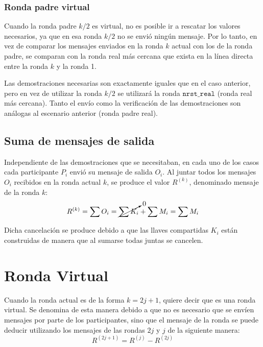 \subsubsection{Ronda padre virtual}

Cuando la ronda padre $k/2$ es virtual, no es posible ir a rescatar los valores necesarios, ya que en esa ronda $k/2$ no se envió ningún mensaje. Por lo tanto, en vez de comparar los mensajes enviados en la ronda $k$ actual con los de la ronda padre, se comparan con la ronda real más cercana que exista en la línea directa entre la ronda $k$ y la ronda 1. 


Las demostraciones necesarias son exactamente iguales que en el caso anterior, pero en vez de utilizar la ronda $k/2$ se utilizará la ronda $\mathtt{nrst\_real}$ (ronda real más cercana). Tanto el envío como la verificación de las demostraciones son análogas al escenario anterior (ronda padre real).

\subsection{Suma de mensajes de salida}

Independiente de las demostraciones que se necesitaban, en cada uno de los casos cada participante $P_i$ envió su mensaje de salida $O_i$. Al juntar todos los mensajes $O_i$ recibidos en la ronda actual $k$, se produce el valor $R^{(k)}$, denominado mensaje de la ronda $k$: $$R^{(k)} = \sum O_i = \cancelto{0}{\sum K_i} + \sum M_i = \sum M_i$$

Dicha cancelación se produce debido a que las llaves compartidas $K_i$ están construidas de manera que al sumarse todas juntas se cancelen.

\section{Ronda Virtual}

Cuando la ronda actual es de la forma $k = 2j + 1$, quiere decir que es una ronda virtual. Se denomina de esta manera debido a que no es necesario que se envíen mensajes por parte de los participantes, sino que el mensaje de la ronda se puede deducir utilizando los mensajes de las rondas $2j$ y $j$ de la siguiente manera: $$R^{(2j + 1)} = R^{(j)} - R^{(2j)}$$


